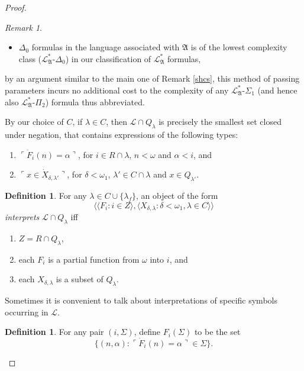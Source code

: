 \documentclass[12pt, twoside]{memoir}
\numberwithin{equation}{section}
\theoremstyle{definition}
\newtheorem{defi}[thm]{Definition}
\theoremstyle{remark}
\newtheorem{rem}[thm]{Remark}
\theoremstyle{definition}
\theoremstyle{definition}
\theoremstyle{definition}
\theoremstyle{remark}
\begin{document}
\begin{proof}
\begin{rem}
\begin{itemize}
    \item $\Delta_0$ formulas in the language associated with $\mathfrak{A}$ is of the lowest complexity class ($\mathcal{L}^{*}_{\mathfrak{A}}$-$\Delta_0$) in our classification of $\mathcal{L}^{*}_{\mathfrak{A}}$ formulas,
\end{itemize} 
by an argument similar to the main one of Remark \ref{shcs}, this method of passing parameters incurs no additional cost to the complexity of any $\mathcal{L}^{*}_{\mathfrak{A}}$-$\Sigma_1$ (and hence also $\mathcal{L}^{*}_{\mathfrak{A}}$-$\Pi_2$) formula thus abbreviated.
\end{rem}

By our choice of $C$, if $\lambda \in C$, then $\mathcal{L} \cap Q_{\lambda}$ is precisely the smallest set closed under negation, that contains expressions of the following types: 
\begin{enumerate}[label=(L\arabic*)$_{\lambda}$, leftmargin=45pt]
    \item\label{l1lamb} $\ulcorner \dot{F}_i (n) = \alpha \urcorner$, for $i \in R \cap \lambda$, $n < \omega$ and $\alpha < i$, and
    \item\label{l2lamb} $\ulcorner x \in \dot{X}_{\delta, \lambda'} \urcorner$, for $\delta < \omega_1$, $\lambda' \in C \cap \lambda$ and $x \in Q_{\lambda'}$.
\end{enumerate}

\begin{defi}\label{def412}
For any $\lambda \in C \cup \{\lambda_f\}$, an object of the form $$\langle \langle F_i : i \in Z \rangle, \langle X_{\delta, \lambda} : \delta < \omega_1, \lambda \in C \rangle \rangle$$ \emph{interprets} $\mathcal{L} \cap Q_{\lambda}$ iff 
\begin{enumerate}[label=(\alph*)]
    \item $Z = R \cap Q_{\lambda}$,
    \item each $F_i$ is a partial function from $\omega$ into $i$, and 
    \item each $X_{\delta, \lambda}$ is a subset of $Q_{\lambda}$. 
\end{enumerate}
\end{defi}

Sometimes it is convenient to talk about interpretations of specific symbols occurring in $\mathcal{L}$.

\begin{defi}
For any pair $(i, \Sigma)$, define $F_i(\Sigma)$ to be the set $$\{(n, \alpha) : \ulcorner \dot{F}_i(n) = \alpha \urcorner \in \Sigma\}.$$
\end{defi}


\end{proof}
\end{document}
